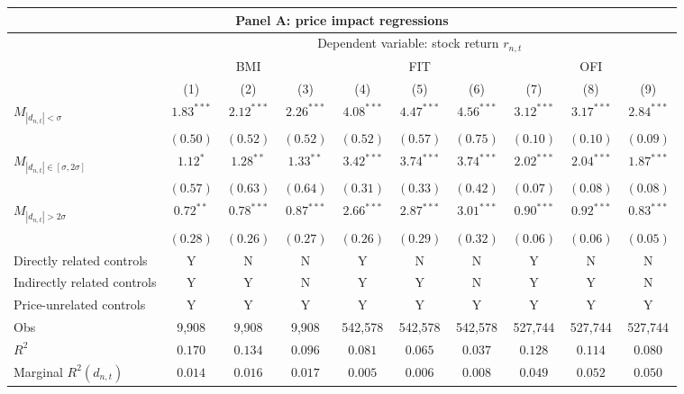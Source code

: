 \begin{tabular}{lccccccccc}
  \hline \multicolumn{10}{c}{Panel A: price impact regressions} \\
 \hline
                                    & \multicolumn{9}{c}{Dependent variable: stock return $r_{n,t}$} \\

                                    \cmidrule(l){2-10} & \multicolumn{3}{c}{BMI} & \multicolumn{3}{c}{FIT} & \multicolumn{3}{c}{OFI} \\
 \cmidrule(l){2-4} \cmidrule(l){5-7} \cmidrule(l){8-10} 
  & (1) & (2) & (3) & (4) & (5) & (6) & (7) & (8) & (9) \\ 
  $M_{|d_{n,t}| < \sigma}$ & $1.83^{***}$ & $2.12^{***}$ & $2.26^{***}$ & $4.08^{***}$ & $4.47^{***}$ & $4.56^{***}$ & $3.12^{***}$ & $3.17^{***}$ & $2.84^{***}$ \\ 
   & $(0.50)$ & $(0.52)$ & $(0.52)$ & $(0.52)$ & $(0.57)$ & $(0.75)$ & $(0.10)$ & $(0.10)$ & $(0.09)$ \\ 
  $M_{|d_{n,t}| \in [\sigma, 2\sigma]}$ & $1.12^{*}$ & $1.28^{**}$ & $1.33^{**}$ & $3.42^{***}$ & $3.74^{***}$ & $3.74^{***}$ & $2.02^{***}$ & $2.04^{***}$ & $1.87^{***}$ \\ 
   & $(0.57)$ & $(0.63)$ & $(0.64)$ & $(0.31)$ & $(0.33)$ & $(0.42)$ & $(0.07)$ & $(0.08)$ & $(0.08)$ \\ 
  $M_{|d_{n,t}| > 2 \sigma}$ & $0.72^{**}$ & $0.78^{***}$ & $0.87^{***}$ & $2.66^{***}$ & $2.87^{***}$ & $3.01^{***}$ & $0.90^{***}$ & $0.92^{***}$ & $0.83^{***}$ \\ 
   \vspace{5pt} & $(0.28)$ & $(0.26)$ & $(0.27)$ & $(0.26)$ & $(0.29)$ & $(0.32)$ & $(0.06)$ & $(0.06)$ & $(0.05)$ \\ 
  Directly related controls & Y & N & N & Y & N & N & Y & N & N \\ 
  Indirectly related controls & Y & Y & N & Y & Y & N & Y & Y & N \\ 
   \vspace{5pt}Price-unrelated controls & Y & Y & Y & Y & Y & Y & Y & Y & Y \\ 
  Obs & 9,908 & 9,908 & 9,908 & 542,578 & 542,578 & 542,578 & 527,744 & 527,744 & 527,744 \\ 
  $R^2$ & $0.170$ & $0.134$ & $0.096$ & $0.081$ & $0.065$ & $0.037$ & $0.128$ & $0.114$ & $0.080$ \\ 
  Marginal $R^2(d_{n,t})$ & $0.014$ & $0.016$ & $0.017$ & $0.005$ & $0.006$ & $0.008$ & $0.049$ & $0.052$ & $0.050$ \\ 

\end{tabular}
